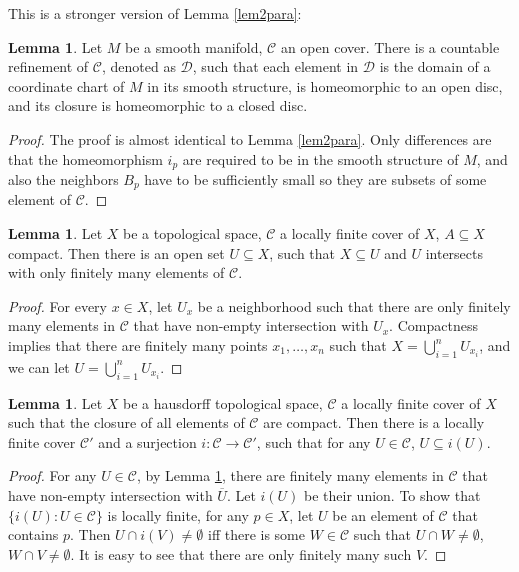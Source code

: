 \documentclass{article}
\theoremstyle{definition}
\newtheorem{lem}[thm]{Lemma}
\begin{document}
This is a stronger version of Lemma \ref{lem2para}:

\begin{lem}\label{lem3pu}
    Let $M$ be a smooth manifold, $\mathcal{C}$ an open cover. There is a countable refinement of $\mathcal{C}$, denoted as $\mathcal{D}$, such that each element in $\mathcal{D}$ is the domain of a coordinate chart of $M$ in its smooth structure, is homeomorphic to an open disc, and its closure is homeomorphic to a closed disc. 
\end{lem}

\begin{proof}
 The proof is almost identical to Lemma \ref{lem2para}. Only differences are that the homeomorphism $i_p$ are required to be in the smooth structure of $M$, and also the neighbors $B_p$ have to be sufficiently small so they are subsets of some element of $\mathcal{C}$.
\end{proof}

\begin{lem}\label{lem4pu}
    Let $X$ be a topological space, $\mathcal{C}$ a locally finite cover of $X$, $A\subseteq X$ compact. Then there is an open set $U\subseteq X$, such that $X\subseteq U$ and $U$ intersects with only finitely many elements of $\mathcal{C}$.
\end{lem}

\begin{proof}
    For every $x\in X$, let $U_x$ be a neighborhood such that there are only finitely many elements in $\mathcal{C}$ that have non-empty intersection with $U_x$. Compactness implies that there are finitely many points $x_1, \dots, x_n$ such that $X=\bigcup_{i=1}^n U_{x_i}$, and we can let $U=\bigcup_{i=1}^n U_{x_i}$.
\end{proof}

\begin{lem}\label{lem5pu}
    Let $X$ be a hausdorff topological space, $\mathcal{C}$ a locally finite cover of $X$ such that the closure of all elements of $\mathcal{C}$ are compact. Then there is a locally finite cover $\mathcal{C}'$ and a surjection $i: \mathcal{C}\rightarrow \mathcal{C}'$, such that for any $U\in \mathcal{C}$, $U\subseteq i(U)$.
\end{lem}

\begin{proof}
    For any $U\in \mathcal{C}$, by Lemma \ref{lem4pu}, there are finitely many elements in $\mathcal{C}$ that have non-empty intersection with $\overline{U}$. Let $i(U)$ be their union. To show that $\{ i(U): U\in\mathcal{C}\}$ is locally finite, for any $p\in X$, let $U$ be an element of $\mathcal{C}$ that contains $p$. Then $U\cap i(V)\not=\emptyset$ iff there is some $W\in\mathcal{C}$ such that $U\cap W\not=\emptyset$, $W\cap V\not=\emptyset$. It is easy to see that there are only finitely many such $V$.
\end{proof}
\end{document}
